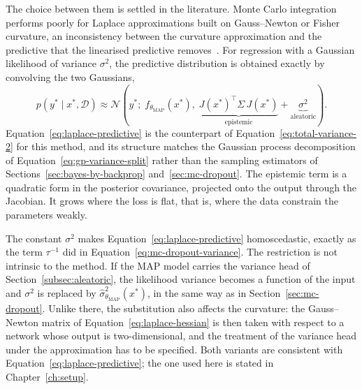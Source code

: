 The choice between them is settled in the literature. Monte Carlo integration
performs poorly for Laplace approximations built on Gauss--Newton or Fisher
curvature, an inconsistency between the curvature approximation and the
predictive that the linearised predictive removes~\cite{daxberger2021}. For
regression with a Gaussian likelihood of variance $\sigma^2$, the predictive
distribution is obtained exactly by convolving the two Gaussians,
%
\begin{equation}
    p(y^\ast \mid x^\ast, \mathcal{D})
    \approx
    \mathcal{N}\!\left(
      y^\ast;\;
      f_{\theta_{\mathrm{MAP}}}(x^\ast),\;
      \underbrace{J(x^\ast)^{\!\top} \Sigma\, J(x^\ast)}_{\text{epistemic}}
      + \underbrace{\sigma^2}_{\text{aleatoric}}
    \right) .
    \label{eq:laplace-predictive}
\end{equation}
%
Equation~\eqref{eq:laplace-predictive} is the counterpart of Equation~\eqref{eq:total-variance-2} for this method, and its structure matches the Gaussian process decomposition of Equation~\eqref{eq:gp-variance-split} rather than the sampling estimators of Sections~\ref{sec:bayes-by-backprop} and~\ref{sec:mc-dropout}. The epistemic term is a quadratic form in the posterior covariance, projected onto the output through the Jacobian. It grows where the loss is flat, that is, where the data constrain the parameters weakly.


The constant $\sigma^2$ makes Equation~\eqref{eq:laplace-predictive}
homoscedastic, exactly as the term $\tau^{-1}$ did in
Equation~\eqref{eq:mc-dropout-variance}. The restriction is not intrinsic to
the method. If the MAP model carries the variance head of
Section~\ref{subsec:aleatoric}, the likelihood variance becomes a function of
the input and $\sigma^2$ is replaced by
$\hat{\sigma}^2_{\theta_{\mathrm{MAP}}}(x^\ast)$, in the same way as in
Section~\ref{sec:mc-dropout}. Unlike there, the substitution also affects the
curvature: the Gauss--Newton matrix of Equation~\eqref{eq:laplace-hessian} is
then taken with respect to a network whose output is two-dimensional, and the
treatment of the variance head under the approximation has to be specified.
Both variants are consistent with Equation~\eqref{eq:laplace-predictive}; the
one used here is stated in Chapter~\ref{ch:setup}.

